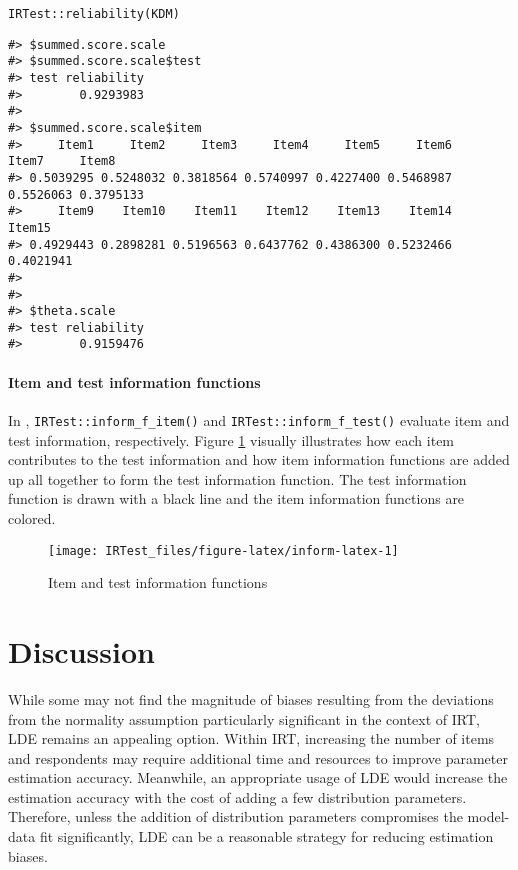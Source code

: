 \begin{verbatim}
IRTest::reliability(KDM)
\end{verbatim}

\begin{verbatim}
#> $summed.score.scale
#> $summed.score.scale$test
#> test reliability 
#>        0.9293983 
#> 
#> $summed.score.scale$item
#>     Item1     Item2     Item3     Item4     Item5     Item6     Item7     Item8 
#> 0.5039295 0.5248032 0.3818564 0.5740997 0.4227400 0.5468987 0.5526063 0.3795133 
#>     Item9    Item10    Item11    Item12    Item13    Item14    Item15 
#> 0.4929443 0.2898281 0.5196563 0.6437762 0.4386300 0.5232466 0.4021941 
#> 
#> 
#> $theta.scale
#> test reliability 
#>        0.9159476
\end{verbatim}

\hypertarget{item-and-test-information-functions}{%
\paragraph{Item and test information functions}\label{item-and-test-information-functions}}

In , \texttt{IRTest::inform\_f\_item()} and \texttt{IRTest::inform\_f\_test()} evaluate
item and test information, respectively. Figure
\ref{fig:inform-latex}
visually illustrates how each item contributes to the test information
and how item information functions are added up all together to form the test
information function. The test information function is drawn with a black
line and the item information functions are colored.

\begin{figure}[H]

{\centering \texttt{[image: IRTest\_files/figure-latex/inform-latex-1]} 

}

\caption{Item and test information functions}\label{fig:inform-latex}
\end{figure}

\hypertarget{discussion}{%
\section{Discussion}\label{discussion}}

While some may not find the magnitude of biases resulting from the deviations
from the normality assumption particularly significant in the context of
IRT, LDE remains an appealing option. Within IRT, increasing the number of
items and respondents may require additional time and resources to improve parameter estimation accuracy.
Meanwhile, an appropriate usage of LDE would increase the estimation
accuracy with the cost of adding a few distribution parameters. Therefore,
unless the addition of distribution parameters compromises the model-data fit significantly,
LDE can be a reasonable strategy for reducing estimation biases.

